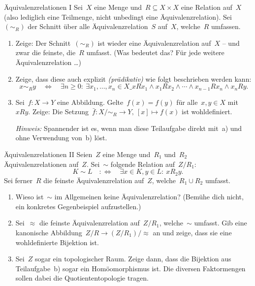 \documentclass{uebblatt}
\begin{document}

\begin{aufgabe}{Äquivalenzrelationen I}
Sei~$X$ eine Menge und~$R \subseteq X \times X$ eine Relation auf~$X$
(also lediglich eine Teilmenge, nicht unbedingt eine Äquivalenzrelation).
Sei~$(\sim_R)$ der Schnitt über alle Äquivalenzrelation~$S$ auf~$X$, welche~$R$
umfassen.
\begin{enumerate}
\item Zeige: Der Schnitt~$(\sim_R)$ ist wieder eine Äquivalenzrelation auf~$X$
-- und zwar die feinste, die~$R$ umfasst. (Was bedeutet das? Für jede weitere
Äquivalenzrelation \ldots)

\item Zeige, dass diese auch explizit \emph{(prädikativ)} wie folgt beschrieben
werden kann:
\[ x \sim_R y \quad\Longleftrightarrow\quad
  \exists n \geq 0{:}\
  \exists x_1,\ldots,x_n \in X\_
  x R x_1 \wedge x_1 R x_2 \wedge \cdots \wedge x_{n-1} R x_n \wedge x_n R y.
  \]

\item Sei~$f : X \to Y$ eine Abbildung. Gelte~$f(x) = f(y)$ für alle~$x,y \in
X$ mit~$xRy$. Zeige: Die Setzung~$\bar f : X/{\sim_R} \to Y,\ [x] \mapsto f(x)$
ist wohldefiniert.

\emph{Hinweis:} Spannender ist es, wenn man diese Teilaufgabe direkt mit~a) und
ohne Verwendung von~b) löst.
\end{enumerate}
\end{aufgabe}

\begin{aufgabe}{Äquivalenzrelationen II}
Seien~$Z$ eine Menge und~$R_1$ und~$R_2$ Äquivalenzrelationen auf~$Z$.
Sei~$\sim$ folgende Relation auf~$Z/R_1$:
\[ K \sim L \quad:\Longleftrightarrow\quad
  \exists x \in K, y \in L{:}\ x R_2 y. \]
Sei ferner~$R$ die feinste Äquivalenzrelation auf~$Z$,
welche~$R_1 \cup R_2$ umfasst.

\begin{enumerate}
\item Wieso ist~$\sim$ im Allgemeinen keine Äquivalenzrelation? (Bemühe dich
nicht, ein konkretes Gegenbeispiel aufzustellen.)
\item Sei~$\approx$ die feinste Äquivalenzrelation auf~$Z/R_1$, welche~$\sim$
umfasst. Gib eine kanonische Abbildung~$Z/R \to (Z/R_1)/{\approx}$ an und zeige,
dass sie eine wohldefinierte Bijektion ist.
\item Sei~$Z$ sogar ein topologischer Raum. Zeige dann, dass die Bijektion aus
Teilaufgabe~b) sogar ein Homöomorphismus ist. Die diversen Faktormengen
sollen dabei die Quotiententopologie tragen.
\end{enumerate}
\end{aufgabe}
\end{document}
